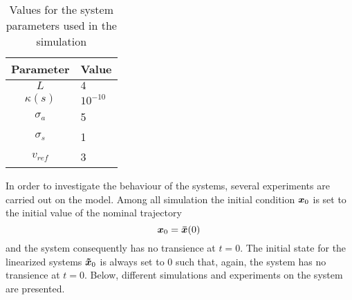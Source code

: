 \begin{table}[h]
	\centering
	\begin{tabular}{c|l}
	\hline
	\hline
	\textbf{Parameter} & \textbf{Value}\\
	\hline
	$L$ & $4$\\
	$\kappa (s)$ & $10^{-10}$\\
	$\sigma_a$ & 5\\
	$\sigma_s$ & 1\\
	$v_{ref}$ & 3\\
	\hline
	\hline
	\end{tabular}
	\caption{Values for the system parameters used in the simulation}
	\label{tab:simu_param_values}
\end{table}
In order to investigate the behaviour of the systems, several experiments are carried out on the model.
Among all simulation the initial condition $\boldsymbol{x}_0$ is set to the initial value of the nominal trajectory 
\begin{equation}
	\boldsymbol{x}_0 = \boldsymbol{\bar{x}} (0) \, 
\end{equation}
and the system consequently has no transience at $t = 0$. 
The initial state for the linearized systems $\boldsymbol{\tilde{x}}_0$ is always set to $0$ such that, again, the system has no transience at $t=0$.
Below, different simulations and experiments on the system are presented.

